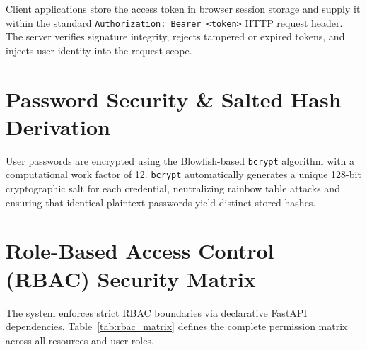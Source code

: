 \documentclass[11pt,a4paper,oneside]{report}
\begin{document}
Client applications store the access token in browser session storage and supply it within the standard \texttt{Authorization: Bearer <token>} HTTP request header. The server verifies signature integrity, rejects tampered or expired tokens, and injects user identity into the request scope.

\section{Password Security \& Salted Hash Derivation}
\label{sec:sec_passwords}
User passwords are encrypted using the Blowfish-based \texttt{bcrypt} algorithm with a computational work factor of 12. \texttt{bcrypt} automatically generates a unique 128-bit cryptographic salt for each credential, neutralizing rainbow table attacks and ensuring that identical plaintext passwords yield distinct stored hashes.

\section{Role-Based Access Control (RBAC) Security Matrix}
\label{sec:sec_rbac_matrix}
The system enforces strict RBAC boundaries via declarative FastAPI dependencies. Table~\ref{tab:rbac_matrix} defines the complete permission matrix across all resources and user roles.
\end{document}
